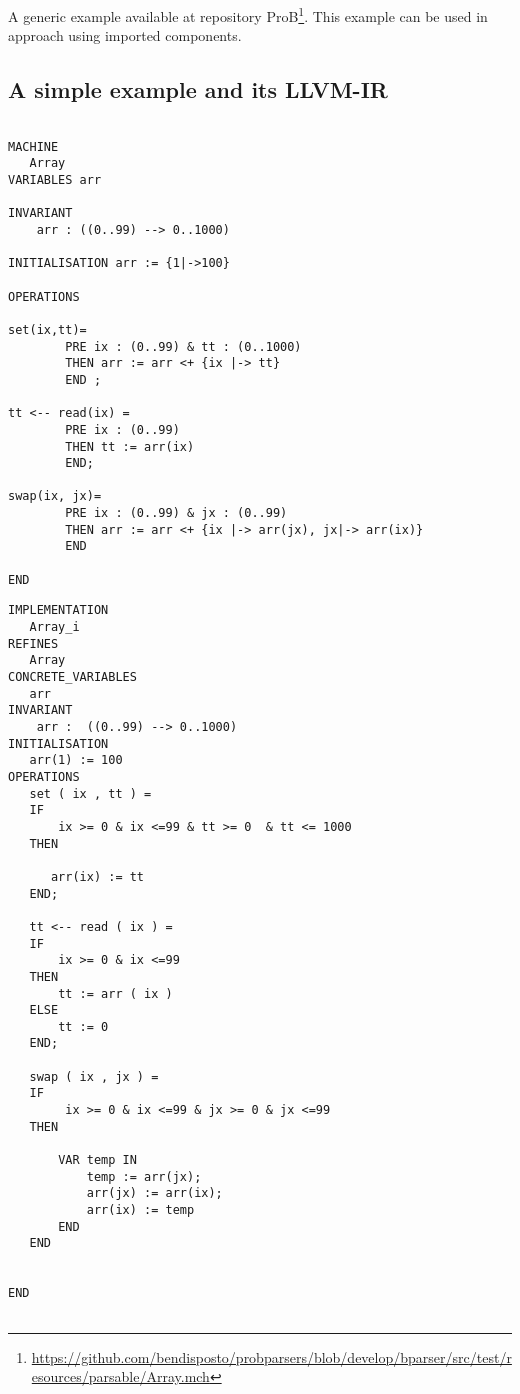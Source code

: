 \documentclass[10pt,a4paper]{article}
\begin{document}
A generic example available at repository ProB\footnote{
\url{https://github.com/bendisposto/probparsers/blob/develop/bparser/src/test/resources/parsable/Array.mch}}. 
This example can be used in approach using imported components.




\subsection{A  simple example and its LLVM-IR}


\begin{verbatim}

MACHINE
   Array
VARIABLES arr

INVARIANT 
    arr : ((0..99) --> 0..1000)

INITIALISATION arr := {1|->100}

OPERATIONS 

set(ix,tt)=
        PRE ix : (0..99) & tt : (0..1000)
        THEN arr := arr <+ {ix |-> tt}
        END ;

tt <-- read(ix) =
        PRE ix : (0..99)
        THEN tt := arr(ix)
        END;

swap(ix, jx)=
        PRE ix : (0..99) & jx : (0..99)
        THEN arr := arr <+ {ix |-> arr(jx), jx|-> arr(ix)}
        END

END
\end{verbatim}

\begin{verbatim}
IMPLEMENTATION 
   Array_i
REFINES
   Array
CONCRETE_VARIABLES
   arr
INVARIANT 
    arr :  ((0..99) --> 0..1000)
INITIALISATION
   arr(1) := 100
OPERATIONS
   set ( ix , tt ) =
   IF
       ix >= 0 & ix <=99 & tt >= 0  & tt <= 1000
   THEN
       
      arr(ix) := tt 
   END;

   tt <-- read ( ix ) =
   IF
       ix >= 0 & ix <=99
   THEN
       tt := arr ( ix )
   ELSE
       tt := 0
   END;

   swap ( ix , jx ) =
   IF
        ix >= 0 & ix <=99 & jx >= 0 & jx <=99 
   THEN

       VAR temp IN
           temp := arr(jx);
           arr(jx) := arr(ix);
           arr(ix) := temp
       END
   END


END


\end{verbatim}
\end{document}

